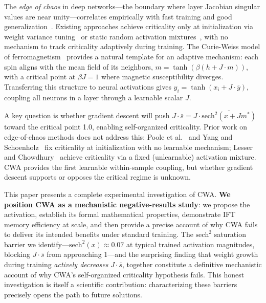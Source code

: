 \documentclass[11pt,twocolumn,letterpaper]{article}
\begin{document}
The \emph{edge of chaos} in deep networks---the boundary where layer Jacobian singular values are near unity---correlates
empirically with fast training and good generalization~\cite{Poole2016,Yang2017}. Existing approaches achieve criticality
only at initialization via weight variance tuning~\cite{Poole2016,Yang2017} or static random activation
mixtures~\cite{Lesser2026}, with no mechanism to track criticality adaptively during training. The Curie-Weiss model of
ferromagnetism~\cite{Curie1895} provides a natural template for an adaptive mechanism: each spin aligns with the mean field
of its neighbors, $m = \tanh(\beta(h + J\cdot m))$, with a critical point at $\beta J = 1$ where magnetic susceptibility
diverges. Transferring this structure to neural activations gives $y_i = \tanh(x_i + J\cdot\overline{y})$, coupling all
neurons in a layer through a learnable scalar $J$.

A key question is whether gradient descent will push $J\cdot\bar{s} = J\cdot\overline{\text{sech}^2(x+Jm^*)}$ toward the
critical point 1.0, enabling self-organized criticality. Prior work on edge-of-chaos methods does not address this:
Poole et al.~\cite{Poole2016} and Yang and Schoenholz~\cite{Yang2017} fix criticality at initialization with no learnable
mechanism; Lesser and Chowdhury~\cite{Lesser2026} achieve criticality via a fixed (unlearnable) activation mixture. CWA
provides the first learnable within-sample coupling, but whether gradient descent supports or opposes the critical regime is
unknown.

This paper presents a complete experimental investigation of CWA. \textbf{We position CWA as a mechanistic negative-results
study}: we propose the activation, establish its formal mathematical properties, demonstrate IFT memory efficiency at scale,
and then provide a precise account of why CWA fails to deliver its intended benefits under standard training. The
$\text{sech}^2$ saturation barrier we identify---$\text{sech}^2(x) \approx 0.07$ at typical trained activation magnitudes,
blocking $J\cdot\bar{s}$ from approaching 1---and the surprising finding that weight growth during training \emph{actively
decreases} $J\cdot\bar{s}$, together constitute a definitive mechanistic account of why CWA's self-organized criticality
hypothesis fails. This honest investigation is itself a scientific contribution: characterizing these barriers precisely
opens the path to future solutions.
\end{document}
